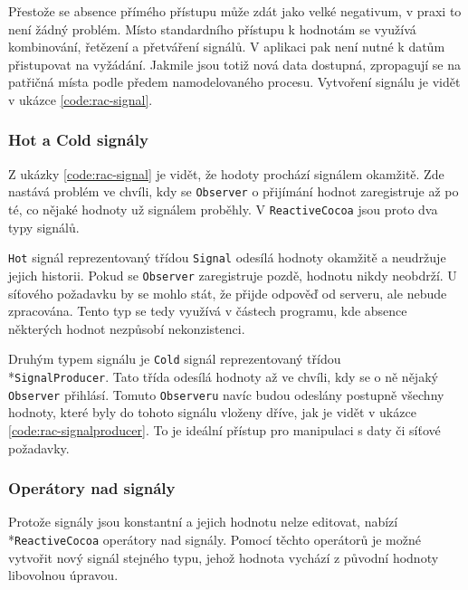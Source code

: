 Přestože se absence přímého přístupu může zdát jako velké negativum, v praxi to není žádný problém.
Místo standardního přístupu k hodnotám se využívá kombinování, řetězení a přetváření signálů.
V aplikaci pak není nutné k datům přistupovat na vyžádání.
Jakmile jsou totiž nová data dostupná, zpropagují se na patřičná místa podle předem namodelovaného procesu.
Vytvoření signálu je vidět v ukázce \ref{code:rac-signal}.


\subsubsection*{Hot a Cold signály}

Z ukázky \ref{code:rac-signal} je vidět, že hodoty prochází signálem okamžitě.
Zde nastává problém ve chvíli, kdy se \texttt{Observer} o přijímání hodnot zaregistruje až po té, co nějaké hodnoty už signálem proběhly.
V \texttt{ReactiveCocoa} jsou proto dva typy signálů.

\texttt{Hot} signál reprezentovaný třídou \texttt{Signal} odesílá hodnoty okamžitě a neudržuje jejich historii.
Pokud se \texttt{Observer} zaregistruje pozdě, hodnotu nikdy neobdrží.
U síťového požadavku by se mohlo stát, že přijde odpověď od serveru, ale nebude zpracována.
Tento typ se tedy využívá v částech programu, kde absence některých hodnot nezpůsobí nekonzistenci.

Druhým typem signálu je \texttt{Cold} signál reprezentovaný třídou\\*\texttt{SignalProducer}.
Tato třída odesílá hodnoty až ve chvíli, kdy se o ně nějaký \texttt{Observer} přihlásí.
Tomuto \texttt{Observeru} navíc budou odeslány postupně všechny hodnoty, které byly do tohoto signálu vloženy dříve, jak je vidět v ukázce \ref{code:rac-signalproducer}.
To je ideální přístup pro manipulaci s daty či síťové požadavky.


\subsubsection*{Operátory nad signály}

Protože signály jsou konstantní a jejich hodnotu nelze editovat, nabízí\\*\texttt{ReactiveCocoa} operátory nad signály.
Pomocí těchto operátorů je možné vytvořit nový signál stejného typu, jehož hodnota vychází z původní hodnoty libovolnou úpravou.

